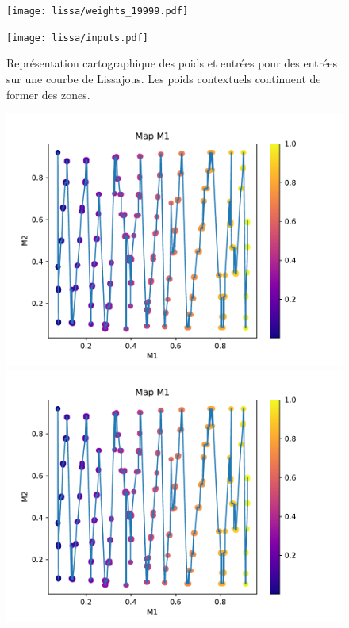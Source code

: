 \documentclass[../main]{subfiles}
\begin{document}
\begin{figure}
	\begin{minipage}{0.6\textwidth}
	\texttt{[image: lissa/weights\_19999.pdf]}
	\end{minipage}
	\begin{minipage}{0.4\textwidth}
		\texttt{[image: lissa/inputs.pdf]}
	\end{minipage}
	\caption{Représentation cartographique des poids et entrées pour des entrées sur une courbe de Lissajous. Les poids contextuels continuent de former des zones.}
\end{figure}

\begin{figure}
	\begin{minipage}{0.48\textwidth}
		\includegraphics[width=\textwidth]{2som_square_d}
	\end{minipage}
	\begin{minipage}{0.48\textwidth}
		\includegraphics[width=\textwidth]{2som_square_d}

\end{minipage}
\end{figure}
\end{document}

